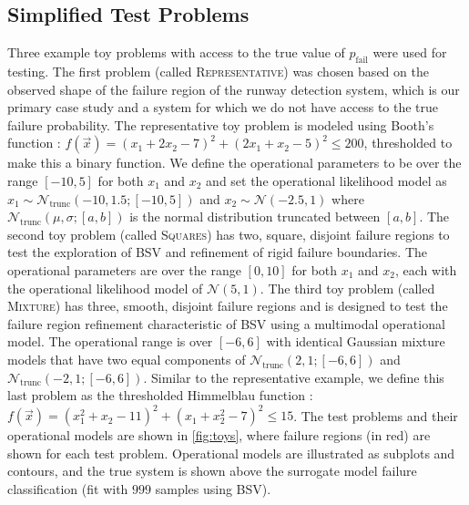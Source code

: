\subsection{Simplified Test Problems}\label{sec:toys}
Three example toy problems with access to the true value of $p_\text{fail}$ were used for testing.
The first problem (called \textsc{Representative}) was chosen based on the observed shape of the failure region of the runway detection system, which is our primary case study and a system for which we do not have access to the true failure probability.
The representative toy problem is modeled using Booth's function \cite{optbook}: $f(\vec{x}) = (x_1 + 2x_2 - 7)^2 + (2x_1 + x_2 - 5)^2 \le 200$, thresholded to make this a binary function.
We define the operational parameters to be over the range $[-10, 5]$ for both $x_1$ and $x_2$ and set the operational likelihood model as $x_1 \sim \mathcal{N}_\text{trunc}(-10, 1.5; [-10, 5])$ and $x_2 \sim \mathcal{N}(-2.5, 1)$ where $\mathcal{N}_\text{trunc}(\mu, \sigma; [a, b])$ is the normal distribution truncated between $[a,b]$.
The second toy problem (called \textsc{Squares}) has two, square, disjoint failure regions to test the exploration of BSV and refinement of rigid failure boundaries.
The operational parameters are over the range $[0, 10]$ for both $x_1$ and $x_2$, each with the operational likelihood model of $\mathcal{N}(5, 1)$.
The third toy problem (called \textsc{Mixture}) has three, smooth, disjoint failure regions and is designed to test the failure region refinement characteristic of BSV using a multimodal operational model.
The operational range is over $[-6, 6]$ with identical Gaussian mixture models that have two equal components of $\mathcal{N}_\text{trunc}(2,1; [-6,6])$ and $\mathcal{N}_\text{trunc}(-2,1; [-6,6])$.
Similar to the representative example, we define this last problem as the thresholded Himmelblau function \cite{himmelblau1972applied}: $f(\vec{x}) = (x_1^2 + x_2 - 11)^2 + (x_1 + x_2^2 - 7)^2 \le 15$.
The test problems and their operational models are shown in \cref{fig:toys}, where failure regions (in red) are shown for each test problem.
Operational models are illustrated as subplots and contours, and the true system is shown above the surrogate model failure classification (fit with $\num{999}$ samples using BSV).


